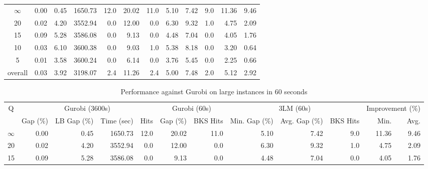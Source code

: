\begin{table}[H]
\begin{tabular}{c rrrr rr rrr rr}
\cmidrule(lr){1-1} \cmidrule(lr){2-5} \cmidrule(lr){2-5} \cmidrule(lr){6-7} \cmidrule(lr){8-10} \cmidrule(lr){11-12}
$\infty$ &           0.00 &        0.45 &    1650.73 & 12.0 &        20.02 &     11.0 &          5.10 &          7.42 &      9.0 &            11.36 & 9.46 \\
      20 &           0.02 &        4.20 &    3552.94 &  0.0 &        12.00 &      0.0 &          6.30 &          9.32 &      1.0 &             4.75 & 2.09 \\
      15 &           0.09 &        5.28 &    3586.08 &  0.0 &         9.13 &      0.0 &          4.48 &          7.04 &      0.0 &             4.05 & 1.76 \\
      10 &           0.03 &        6.10 &    3600.38 &  0.0 &         9.03 &      1.0 &          5.38 &          8.18 &      0.0 &             3.20 & 0.64 \\
       5 &           0.01 &        3.58 &    3600.24 &  0.0 &         6.14 &      0.0 &          3.76 &          5.45 &      0.0 &             2.25 & 0.66 \\
\midrule
 overall &           0.03 &        3.92 &    3198.07 &  2.4 &        11.26 &      2.4 &          5.00 &          7.48 &      2.0 &             5.12 & 2.92 \\
\bottomrule
\end{tabular}
\end{table}\begin{table}[H]
\centering
\caption{Performance against Gurobi on large instances in 60 seconds}
\label{tab:3lm_resuts200T60}
\begin{tabular}{c rrrr rr rrr rr}
\toprule
       Q & \multicolumn{4}{c}{Gurobi (3600s)} & \multicolumn{2}{c}{Gurobi (60s)} & \multicolumn{3}{c}{3LM (60s)} & \multicolumn{2}{c}{Improvement (\%)} \\
         &       Gap (\%) & LB Gap (\%) & Time (sec) & Hits &     Gap (\%) & BKS Hits & Min. Gap (\%) & Avg. Gap (\%) & BKS Hits &             Min. & Avg. \\
\cmidrule(lr){1-1} \cmidrule(lr){2-5} \cmidrule(lr){2-5} \cmidrule(lr){6-7} \cmidrule(lr){8-10} \cmidrule(lr){11-12}
$\infty$ &           0.00 &        0.45 &    1650.73 & 12.0 &        20.02 &     11.0 &          5.10 &          7.42 &      9.0 &            11.36 & 9.46 \\
      20 &           0.02 &        4.20 &    3552.94 &  0.0 &        12.00 &      0.0 &          6.30 &          9.32 &      1.0 &             4.75 & 2.09 \\
      15 &           0.09 &        5.28 &    3586.08 &  0.0 &         9.13 &      0.0 &          4.48 &          7.04 &      0.0 &             4.05 & 1.76 \\

\end{tabular}
\end{table}
